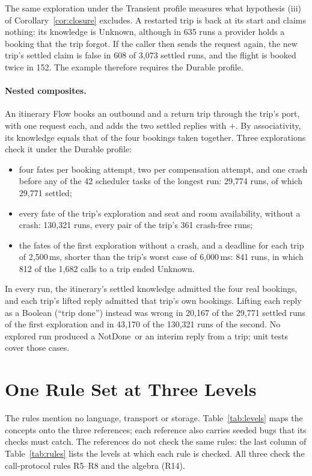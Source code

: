 \documentclass[11pt]{article}
\theoremstyle{definition}
\theoremstyle{plain}
\newcommand{\NotDone}{\textsf{NotDone}}
\newcommand{\Unknown}{\textsf{Unknown}}
\begin{document}
The same exploration under the Transient profile measures what hypothesis (iii) of Corollary~\ref{cor:closure} excludes. A restarted trip is back at its start and claims nothing: its knowledge is \Unknown, although in 635 runs a provider holds a booking that the trip forgot. If the caller then sends the request again, the new trip's settled claim is false in 608 of 3{,}073 settled runs, and the flight is booked twice in 152. The example therefore requires the Durable profile.

\paragraph{Nested composites.} An itinerary Flow books an outbound and a return trip through the trip's port, with one request each, and adds the two settled replies with $+$. By associativity, its knowledge equals that of the four bookings taken together. Three explorations check it under the Durable profile:
\begin{itemize}[nosep]
  \item four fates per booking attempt, two per compensation attempt, and one crash before any of the 42 scheduler tasks of the longest run: 29{,}774 runs, of which 29{,}771 settled;
  \item every fate of the trip's exploration and seat and room availability, without a crash: 130{,}321 runs, every pair of the trip's 361 crash-free runs;
  \item the fates of the first exploration without a crash, and a deadline for each trip of 2{,}500\,ms, shorter than the trip's worst case of 6{,}000\,ms: 841 runs, in which 812 of the 1{,}682 calls to a trip ended \Unknown.
\end{itemize}
In every run, the itinerary's settled knowledge admitted the four real bookings, and each trip's lifted reply admitted that trip's own bookings. Lifting each reply as a Boolean (``trip done'') instead was wrong in 20{,}167 of the 29{,}771 settled runs of the first exploration and in 43{,}170 of the 130{,}321 runs of the second. No explored run produced a \NotDone\ or an interim reply from a trip; unit tests cover those cases.

\section{One Rule Set at Three Levels}
\label{sec:levels}

The rules mention no language, transport or storage. Table~\ref{tab:levels} maps the concepts onto the three references; each reference also carries seeded bugs that its checks must catch. The references do not check the same rules: the last column of Table~\ref{tab:rules} lists the levels at which each rule is checked. All three check the call-protocol rules R5--R8 and the algebra (R14).
\end{document}
